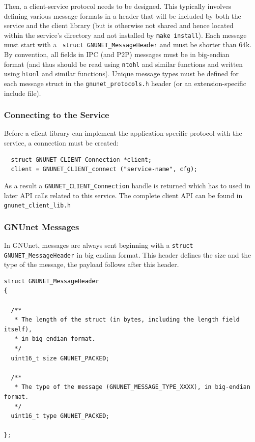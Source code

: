 \documentclass[10pt]{article}
\begin{document}
Then, a client-service protocol needs to be designed.  This typically
involves defining various message formats in a header that will be
included by both the service and the client library (but is otherwise
not shared and hence located within the service's directory and not
installed by {\tt make install}).  Each message must start with a {\tt
  struct GNUNET\_MessageHeader} and must be shorter than 64k.  By
convention, all fields in IPC (and P2P) messages must be in big-endian
format (and thus should be read using {\tt ntohl} and similar
functions and written using {\tt htonl} and similar functions).
Unique message types must be defined for each message struct in the
{\tt gnunet\_protocols.h} header (or an extension-specific include
file).

\subsubsection{Connecting to the Service}

Before a client library can implement the application-specific protocol
with the service, a connection must be created:

\lstset{language=c}
\begin{lstlisting}
  struct GNUNET_CLIENT_Connection *client;
  client = GNUNET_CLIENT_connect ("service-name", cfg);
\end{lstlisting}

As a result a {\tt GNUNET\_CLIENT\_Connection} handle is returned 
which has to used in later API calls related to this service.
The complete client API can be found in {\tt gnunet\_client\_lib.h}

\subsubsection{GNUnet Messages}

In GNUnet, messages are always sent beginning with a {\tt struct GNUNET\_MessageHeader}
in big endian format. This header defines the size and the type of the 
message, the payload follows after this header.

\lstset{language=c}
\begin{lstlisting}
struct GNUNET_MessageHeader
{

  /**
   * The length of the struct (in bytes, including the length field itself),
   * in big-endian format.
   */
  uint16_t size GNUNET_PACKED;

  /**
   * The type of the message (GNUNET_MESSAGE_TYPE_XXXX), in big-endian format.
   */
  uint16_t type GNUNET_PACKED;

};
\end{lstlisting}
\end{document}
